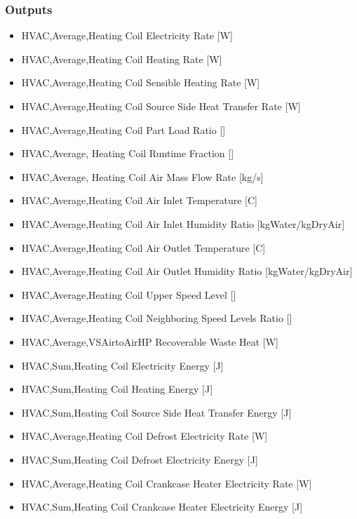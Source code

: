 \subsubsection{Outputs}\label{outputs-17}

\begin{itemize}
\item
  HVAC,Average,Heating Coil Electricity Rate {[}W{]}
\item
  HVAC,Average,Heating Coil Heating Rate {[}W{]}
\item
  HVAC,Average,Heating Coil Sensible Heating Rate {[}W{]}
\item
  HVAC,Average,Heating Coil Source Side Heat Transfer Rate {[}W{]}
\item
  HVAC,Average,Heating Coil Part Load Ratio {[]}
\item
  HVAC,Average, Heating Coil Runtime Fraction {[]}
\item
  HVAC,Average, Heating Coil Air Mass Flow Rate {[}kg/s{]}
\item
  HVAC,Average,Heating Coil Air Inlet Temperature {[}C{]}
\item
  HVAC,Average,Heating Coil Air Inlet Humidity Ratio {[}kgWater/kgDryAir{]}
\item
  HVAC,Average,Heating Coil Air Outlet Temperature {[}C{]}
\item
  HVAC,Average,Heating Coil Air Outlet Humidity Ratio {[}kgWater/kgDryAir{]}
\item
  HVAC,Average,Heating Coil Upper Speed Level {[]}
\item
  HVAC,Average,Heating Coil Neighboring Speed Levels Ratio {[]}
\item
  HVAC,Average,VSAirtoAirHP Recoverable Waste Heat {[}W{]}
\item
  HVAC,Sum,Heating Coil Electricity Energy {[}J{]}
\item
  HVAC,Sum,Heating Coil Heating Energy {[}J{]}
\item
  HVAC,Sum,Heating Coil Source Side Heat Transfer Energy {[}J{]}
\item
  HVAC,Average,Heating Coil Defrost Electricity Rate {[}W{]}
\item
  HVAC,Sum,Heating Coil Defrost Electricity Energy {[}J{]}
\item
  HVAC,Average,Heating Coil Crankcase Heater Electricity Rate {[}W{]}
\item
  HVAC,Sum,Heating Coil Crankcase Heater Electricity Energy {[}J{]}
\end{itemize}

